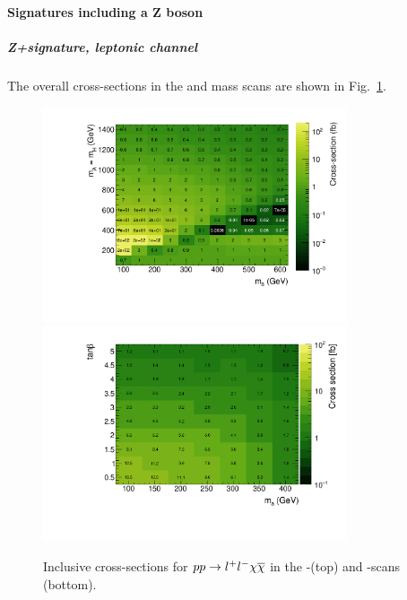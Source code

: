 \paragraph{Signatures including a Z boson}

\subparagraph{Z+\MET signature, leptonic channel}

The overall cross-sections in the \tanb and mass scans are shown in Fig.~\ref{fig:monoz_ll_xs_inclusive}.

\begin{figure}
\centering
\includegraphics[width=0.8\textwidth]{texinputs/04_grid/figures/monoz/leptonic/xs_2d_inclusive_26300.pdf}
\includegraphics[width=0.8\textwidth]{texinputs/04_grid/figures/monoz/leptonic/tanbma_xsec_ll.pdf}
\caption{Inclusive cross-sections for $pp\rightarrow l^{+}l^{-}\chi\overline{\chi}$ in the \ma-\mA (top) and \ma-\tanb scans (bottom).}
\label{fig:monoz_ll_xs_inclusive}
\end{figure}


